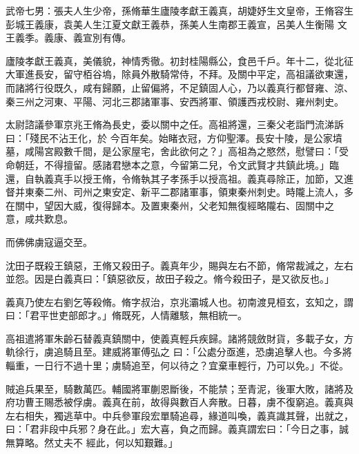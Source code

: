 
\begin{pinyinscope}

 武帝七男：張夫人生少帝，孫脩華生廬陵孝獻王義真，胡婕妤生文皇帝，王脩容生彭城王義康，袁美人生江夏文獻王義恭，孫美人生南郡王義宣，呂美人生衡陽
 文王義季。義康、義宣別有傳。



 廬陵孝獻王義真，美儀貌，神情秀徹。初封桂陽縣公，食邑千戶。年十二，從北征大軍進長安，留守栢谷塢，除員外散騎常侍，不拜。及關中平定，高祖議欲東還，而諸將行役既久，咸有歸願，止留偏將，不足鎮固人心，乃以義真行都督雍、涼、秦三州之河東、平陽、河北三郡諸軍事、安西將軍、領護西戎校尉、雍州刺史。



 太尉諮議參軍京兆王脩為長史，委以關中之任。高祖將還，三秦父老詣門流涕訴曰：「殘民不沾王化，於
 今百年矣。始睹衣冠，方仰聖澤。長安十陵，是公家墳墓，咸陽宮殿數千間，是公家屋宅，舍此欲何之？」高祖為之愍然，慰譬曰：「受命朝廷，不得擅留。感諸君戀本之意，今留第二兒，令文武賢才共鎮此境。」臨還，自執義真手以授王脩，令脩執其子孝孫手以授高祖。義真尋除正，加節，又進督并東秦二州、司州之東安定、新平二郡諸軍事，領東秦州刺史。時隴上流人，多在關中，望因大威，復得歸本。及置東秦州，父老知無復經略隴右、固關中之
 意，咸共歎息。



 而佛佛虜寇逼交至。



 沈田子既殺王鎮惡，王脩又殺田子。義真年少，賜與左右不節，脩常裁減之，左右並怨。因是白義真曰：「鎮惡欲反，故田子殺之。脩今殺田子，是又欲反也。」



 義真乃使左右劉乞等殺脩。脩字叔治，京兆灞城人也。初南渡見桓玄，玄知之，謂曰：「君平世吏部郎才。」脩既死，人情離駭，無相統一。



 高祖遣將軍朱齡石替義真鎮關中，使義真輕兵疾歸。諸將競斂財貨，多載子女，方軌徐行，虜追騎且至。建威將軍傅弘之
 曰：「公處分亟進，恐虜追擊人也。今多將輜重，一日行不過十里；虜騎追至，何以待之？宜棄車輕行，乃可以免。」不從。



 賊追兵果至，騎數萬匹。輔國將軍蒯恩斷後，不能禁；至青泥，後軍大敗，諸將及府功曹王賜悉被俘虜。義真在前，故得與數百人奔散。日暮，虜不復窮追。義真與左右相失，獨逃草中。中兵參軍段宏單騎追尋，緣道叫喚，義真識其聲，出就之，曰：「君非段中兵邪？身在此。」宏大喜，負之而歸。義真謂宏曰：「今日之事，誠無算略。然丈夫不
 經此，何以知艱難。」




\end{pinyinscope}
